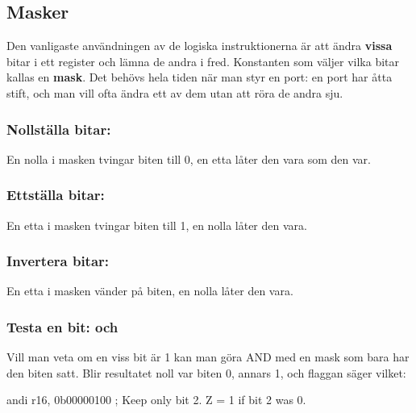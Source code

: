 \subsection{Masker}
\label{c8:b2}
Den vanligaste användningen av de logiska instruktionerna är att ändra \textbf{vissa} bitar i ett
register och lämna de andra i fred. Konstanten som väljer vilka bitar kallas en \textbf{mask}. Det
behövs hela tiden när man styr en port: en port har åtta stift, och man vill ofta ändra ett av dem
utan att röra de andra sju.

\subsubsection{Nollställa bitar: }
En nolla i masken tvingar biten till 0, en etta låter den vara som den var.


\subsubsection{Ettställa bitar: }
En etta i masken tvingar biten till 1, en nolla låter den vara.


\subsubsection{Invertera bitar: }
En etta i masken vänder på biten, en nolla låter den vara.


\subsubsection{Testa en bit:  och }
Vill man veta om en viss bit är 1 kan man göra AND med en mask som bara har den biten satt. Blir
resultatet noll var biten 0, annars 1, och flaggan  säger vilket:

\begin{asmcode}
    andi r16, 0b00000100            ; Keep only bit 2. Z = 1 if bit 2 was 0.
\end{asmcode}

